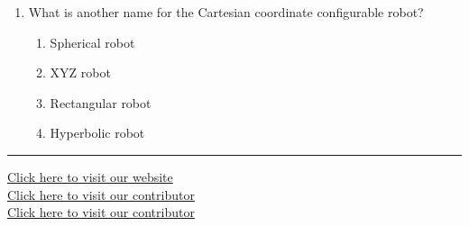 \documentclass[11pt,a4paper]{article}
\begin{document}
\begin{enumerate}[label=(\roman*),leftmargin=*,itemsep=8pt]
\begin{enumerate}[label=(\alph*),itemsep=2pt]
    \item A subset of automation
    \item Unrelated to automation
    \item Only involves computer programming
    \item A replacement for automation
  \end{enumerate}

  \item What is another name for the Cartesian coordinate configurable robot?
  
\begin{enumerate}[label=(\alph*),itemsep=2pt]
    \item Spherical robot
    \item XYZ robot
    \item Rectangular robot
    \item Hyperbolic robot
  \end{enumerate}

\end{enumerate}

\vfill
\rule{\linewidth}{0.4pt}

\begin{center}\small
\href{https://bhu-exam.vercel.app/}{Click here to visit our website}\\[4pt]\href{https://me-aryan.vercel.app/}{Click here to visit our contributor}\\[4pt]\href{https://quashan-me.vercel.app/}{Click here to visit our contributor}
\end{center}
\end{document}
